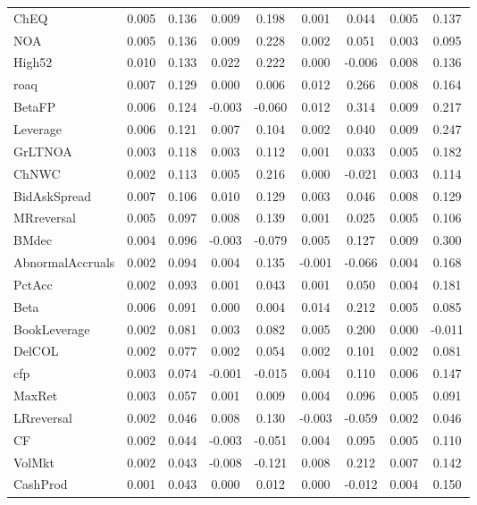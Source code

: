 \begin{table}[H]
\begin{tabular}{lcc|cc|cc|cc}
      ChEQ & 0.005 & 0.136 & 0.009 & 0.198 & 0.001 & 0.044 & 0.005 & 0.137 \\ 
      NOA & 0.005 & 0.136 & 0.009 & 0.228 & 0.002 & 0.051 & 0.003 & 0.095 \\ 
      High52 & 0.010 & 0.133 & 0.022 & 0.222 & 0.000 & -0.006 & 0.008 & 0.136 \\ 
      roaq & 0.007 & 0.129 & 0.000 & 0.006 & 0.012 & 0.266 & 0.008 & 0.164 \\ 
      BetaFP & 0.006 & 0.124 & -0.003 & -0.060 & 0.012 & 0.314 & 0.009 & 0.217 \\ 
      Leverage & 0.006 & 0.121 & 0.007 & 0.104 & 0.002 & 0.040 & 0.009 & 0.247 \\ 
      GrLTNOA & 0.003 & 0.118 & 0.003 & 0.112 & 0.001 & 0.033 & 0.005 & 0.182 \\ 
      ChNWC & 0.002 & 0.113 & 0.005 & 0.216 & 0.000 & -0.021 & 0.003 & 0.114 \\ 
      BidAskSpread & 0.007 & 0.106 & 0.010 & 0.129 & 0.003 & 0.046 & 0.008 & 0.129 \\ 
      MRreversal & 0.005 & 0.097 & 0.008 & 0.139 & 0.001 & 0.025 & 0.005 & 0.106 \\ 
      BMdec & 0.004 & 0.096 & -0.003 & -0.079 & 0.005 & 0.127 & 0.009 & 0.300 \\ 
      AbnormalAccruals & 0.002 & 0.094 & 0.004 & 0.135 & -0.001 & -0.066 & 0.004 & 0.168 \\ 
      PctAcc & 0.002 & 0.093 & 0.001 & 0.043 & 0.001 & 0.050 & 0.004 & 0.181 \\ 
      Beta & 0.006 & 0.091 & 0.000 & 0.004 & 0.014 & 0.212 & 0.005 & 0.085 \\ 
      BookLeverage & 0.002 & 0.081 & 0.003 & 0.082 & 0.005 & 0.200 & 0.000 & -0.011 \\ 
      DelCOL & 0.002 & 0.077 & 0.002 & 0.054 & 0.002 & 0.101 & 0.002 & 0.081 \\ 
      cfp & 0.003 & 0.074 & -0.001 & -0.015 & 0.004 & 0.110 & 0.006 & 0.147 \\ 
      MaxRet & 0.003 & 0.057 & 0.001 & 0.009 & 0.004 & 0.096 & 0.005 & 0.091 \\ 
      LRreversal & 0.002 & 0.046 & 0.008 & 0.130 & -0.003 & -0.059 & 0.002 & 0.046 \\ 
      CF & 0.002 & 0.044 & -0.003 & -0.051 & 0.004 & 0.095 & 0.005 & 0.110 \\ 
      VolMkt & 0.002 & 0.043 & -0.008 & -0.121 & 0.008 & 0.212 & 0.007 & 0.142 \\ 
      CashProd & 0.001 & 0.043 & 0.000 & 0.012 & 0.000 & -0.012 & 0.004 & 0.150 \\ 

\end{tabular}
\end{table}
